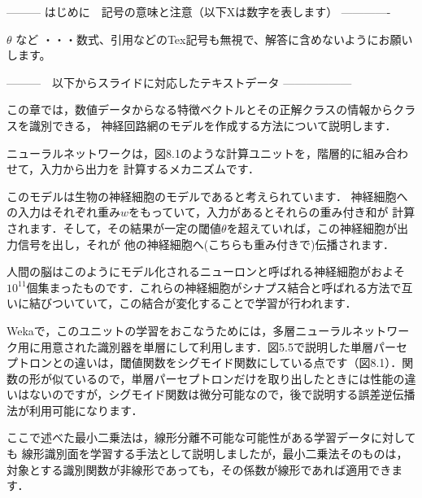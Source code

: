 --------- はじめに　記号の意味と注意（以下Xは数字を表します） -------------

$\theta$ など       ・・・数式、引用などのTex記号も無視で、解答に含めないようにお願いします。
\cite{mitchell97}

---------　以下からスライドに対応したテキストデータ ------------------



この章では，数値データからなる特徴ベクトルとその正解クラスの情報からクラスを識別できる，
神経回路網のモデルを作成する方法について説明します．

ニューラルネットワークは，図8.1のような計算ユニットを，階層的に組み合わせて，入力から出力を
計算するメカニズムです．


このモデルは生物の神経細胞のモデルであると考えられています．
神経細胞への入力はそれぞれ重み$w$をもっていて，入力があるとそれらの重み付き和が
計算されます．そして，その結果が一定の閾値$\theta$を超えていれば，この神経細胞が出力信号を出し，それが
他の神経細胞へ(こちらも重み付きで)伝播されます．

人間の脳はこのようにモデル化されるニューロンと呼ばれる神経細胞がおよそ$10^{11}$個集まったものです．これらの神経細胞がシナプス結合と呼ばれる方法で互いに結びついていて，この結合が変化することで学習が行われます．


Wekaで，このユニットの学習をおこなうためには，多層ニューラルネットワーク用に用意された識別器を単層にして利用します．図5.5で説明した単層パーセプトロンとの違いは，閾値関数をシグモイド関数にしている点です（図8.1）．関数の形が似ているので，単層パーセプトロンだけを取り出したときには性能の違いはないのですが，シグモイド関数は微分可能なので，後で説明する誤差逆伝播法が利用可能になります．

ここで述べた最小二乗法は，線形分離不可能な可能性がある学習データに対しても
線形識別面を学習する手法として説明しましたが，最小二乗法そのものは，
対象とする識別関数が非線形であっても，その係数が線形であれば適用できます．

